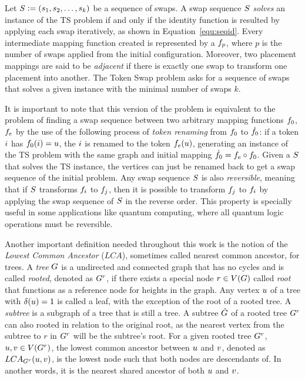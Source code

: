 \documentclass[msc]{ppgccufmg}    %
\begin{document}
Let $S \vcentcolon= (s_1, s_2, \ldots, s_k)$ be a 
sequence of swaps.
A swap sequence $S$ \textit{solves} an instance of the TS problem if and 
only if the identity function is resulted by applying each swap iteratively, as 
shown in Equation~\ref{equ:seqid}. 
Every intermediate mapping function created is represented by a $f_p$, 
where $p$ is the number of swaps applied from the initial configuration.
Moreover, two placement mappings are said to be \textit{adjacent} if there is 
exactly one swap to transform one placement into another.
The Token Swap problem asks for a sequence of swaps that solves a given 
instance with the minimal number of swaps $k$.


It is important to note that this version of the problem is equivalent to the
problem of finding a swap sequence between two arbitrary mapping functions
$f_{0}$, $f_e$ by the use of the following process of \textit{token
renaming} from $f_{0}$ to $\dot{f_{0}}$: if a token $i$ has
$f_{0}(i) = u$, the $i$ is renamed to the 
token $f_{e}(u)$, generating an instance of the TS
problem with the same graph and initial mapping $\dot{f_{0}} = f_{e}
\circ f_{0}$. 
Given a $S$ that solves the TS instance, the vertices can just be renamed 
back to get a swap sequence of the initial problem.
Any swap sequence $S$ is also \textit{reversible}, meaning that if 
$S$ transforms $f_{i}$ to $f_{j}$, then it is possible
to transform $f_{j}$ to $f_{i}$ by applying the swap 
sequence of $S$ in the reverse order.
This property is specially useful in some applications like quantum computing,
where all quantum logic operations must be reversible.


Another important definition needed throughout this work is the notion of the
\textit{Lowest Common Ancestor} ($LCA$), sometimes called nearest common 
ancestor, for trees. 
A \textit{tree} $G$ is a undirected and connected graph that has no cycles 
and is called \textit{rooted}, denoted as $G^{r}$, if there exists a special 
node $r \in V(G)$ called \textit{root} that functions as a reference 
node for heights in the graph.
Any vertex $u$ of a tree with $\delta(u) = 1$ is called a leaf, 
with the exception of the root of a rooted tree.
A \textit{subtree} is a subgraph of a tree that is still a tree. 
A subtree $\dot{G}$ of a rooted tree $G^{r}$ can also rooted in relation 
to the original root, as the nearest vertex from the subtree to $r$ in 
$G^{r}$ will be the subtree's root.
For a given rooted tree $G^{r}$, $u,v \in V(G^{r})$, the 
lowest common ancestor between $u$ and $v$, denoted as $LCA_{G^{r}}(u, v)$, is the lowest node such that both nodes are descendants 
of.
In another words, it is the nearest shared ancestor of both $u$ and
$v$.
\end{document}
